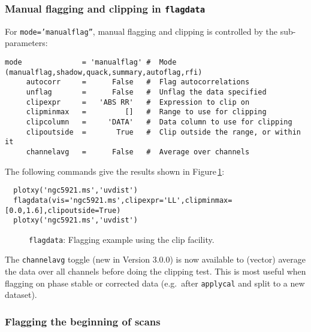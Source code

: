 \subsubsection{Manual flagging and clipping in {\tt flagdata}}
\label{section:edit.flagdata.clip}

For {\tt mode='manualflag''}, manual flagging and clipping is controlled by the
sub-parameters:
\small
\begin{verbatim}
mode              = 'manualflag' #  Mode (manualflag,shadow,quack,summary,autoflag,rfi)
     autocorr     =      False   #  Flag autocorrelations
     unflag       =      False   #  Unflag the data specified
     clipexpr     =   'ABS RR'   #  Expression to clip on
     clipminmax   =         []   #  Range to use for clipping
     clipcolumn   =     'DATA'   #  Data column to use for clipping
     clipoutside  =       True   #  Clip outside the range, or within it
     channelavg   =      False   #  Average over channels
\end{verbatim}
\normalsize

The following commands give the results shown in 
Figure\,\ref{fig:flagdata}:
\small
\begin{verbatim}
  plotxy('ngc5921.ms','uvdist')
  flagdata(vis='ngc5921.ms',clipexpr='LL',clipminmax=[0.0,1.6],clipoutside=True)
  plotxy('ngc5921.ms','uvdist')
\end{verbatim}
\normalsize

\begin{figure}[h!]
\begin{center}
\caption{\label{fig:flagdata} {\tt flagdata}: Flagging example using the clip facility. }
\hrulefill
\end{center}
\end{figure}

The {\tt channelavg} toggle (new in Version 3.0.0) is now available
to (vector) average the data over all channels before doing the
clipping test.  This is most useful when flagging on phase stable or
corrected data (e.g.\ after {\tt applycal} and split to a new
dataset).

\subsubsection{Flagging the beginning of scans}
\label{section:edit.flagdata.quack}

